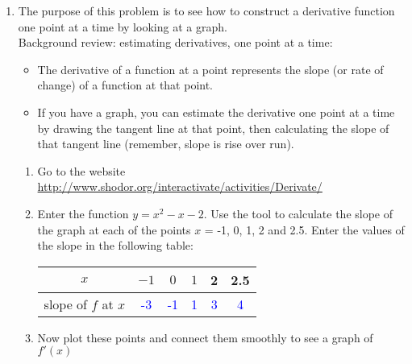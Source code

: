 \documentclass[letterpaper,11pt]{article}
\newcommand{\fsol}[2]{\texttt{[image: \#2sol]}}
\newcommand{\opsol}{1}
\newcommand{\tblsol}[1]{\textcolor{blue}{#1}}
\newcommand{\fsol}[2]{\texttt{[image: \#2]}}
\newcommand{\opsol}{0}
\newcommand{\tblsol}[1]{\textcolor{white}{#1}}
\begin{document}
\chead{}

\begin{enumerate}
\item  The purpose of this problem is to see how to construct a derivative function one point at a time by looking at a graph.\\
Background review: estimating derivatives, one point at a time:
\begin{itemize}
\item The derivative of a function at a point represents the slope (or rate of change) of a function at that point.
\item  If you have a graph, you can estimate the derivative one point at a time by drawing the tangent line at that point, then calculating the slope of that tangent line (remember, slope is rise over run).
\end{itemize}
\begin{enumerate}
\item  Go to the website \url{http://www.shodor.org/interactivate/activities/Derivate/}
\item  Enter the function $y = x^2-x-2$.  Use the tool to calculate the slope of the graph at each of the points $x$ = -1, 0, 1, 2
and 2.5.  Enter the values of the slope in the following table:
\begin{center}
\begin{tabular}{c || c |   c | c | c | c }			
  $x$  & $-1$ & $0$ & $1$  & 2 & 2.5\\
\hline
  slope of  $f$ at $x$ & \tblsol{-3} & \tblsol{-1}& \tblsol{1}& \tblsol{3} & \tblsol{4}   \\
\end{tabular}
\end{center}

\vspace{.2in}


\item Now plot these points and connect them smoothly to see a graph of $f'(x)$

\medskip{}
\end{enumerate}
\end{enumerate}
\end{document}
